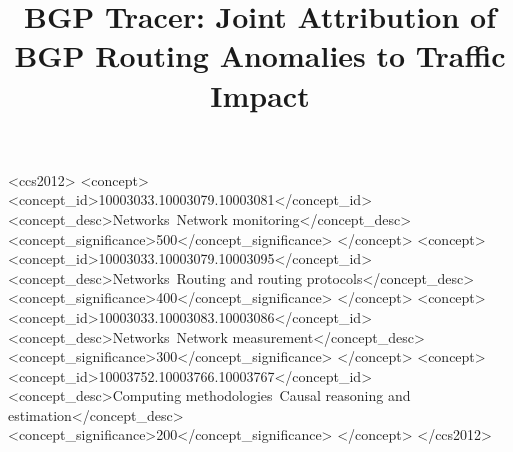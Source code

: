 \documentclass[sigconf,anonymous]{acmart}
\begin{document}
\title{BGP Tracer: Joint Attribution of BGP Routing Anomalies to Traffic Impact}

\begin{CCSXML}
<ccs2012>
<concept>
<concept_id>10003033.10003079.10003081</concept_id>
<concept_desc>Networks~Network monitoring</concept_desc>
<concept_significance>500</concept_significance>
</concept>
<concept>
<concept_id>10003033.10003079.10003095</concept_id>
<concept_desc>Networks~Routing and routing protocols</concept_desc>
<concept_significance>400</concept_significance>
</concept>
<concept>
<concept_id>10003033.10003083.10003086</concept_id>
<concept_desc>Networks~Network measurement</concept_desc>
<concept_significance>300</concept_significance>
</concept>
<concept>
<concept_id>10003752.10003766.10003767</concept_id>
<concept_desc>Computing methodologies~Causal reasoning and estimation</concept_desc>
<concept_significance>200</concept_significance>
</concept>
</ccs2012>
\end{CCSXML}
\end{document}
